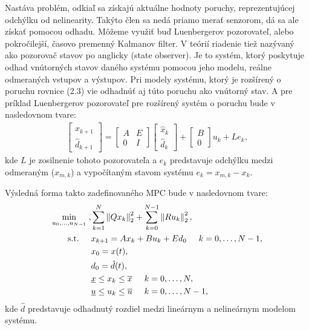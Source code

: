 Nastáva problém, odkiaľ sa získajú aktuálne hodnoty poruchy, reprezentujúcej odchýlku od nelinearity. Takýto člen sa nedá priamo merať senzorom, dá sa ale získať pomocou odhadu. Môžeme využiť buď Luenbergerov pozorovateľ, alebo pokročilejší, časovo premenný Kalmanov filter. V teórií riadenie tiež nazývaný ako pozorovač stavov po anglicky (state observer). Je to systém, ktorý poskytuje odhad vnútorných stavov daného systému pomocou jeho modelu, reálne odmeraných vstupov a výstupov. Pri modely systému, ktorý je rozšírený o poruchu rovnice (2.3) vie odhadnúť aj túto poruchu ako vnútorný stav. A pre príklad Luenbergerov pozorovateľ pre rozšírený systém o poruchu bude v nasledovnom tvare:
\begin{align}
	\begin{bmatrix}
		\hat{x}_{k+1}\\
		\hat{d}_{k+1}
	\end{bmatrix} = 
	\begin{bmatrix}
		A&E\\
		0&I
	\end{bmatrix}
	\begin{bmatrix}
		\hat{x}_{k}\\
		\hat{d}_{k}
	\end{bmatrix}+
	\begin{bmatrix}
		B\\
		0
	\end{bmatrix}u_{k} + Le_{k},
\end{align}
kde $L$ je zosilnenie tohoto pozorovateľa a $e_{k}$ predstavuje odchýlku medzi odmeraným ($x_{m,k}$) a vypočítaným stavom systému $e_{k}= x_{m,k}-x_{k}$.

Výsledná forma takto zadefinovaného MPC bude v nasledovnom tvare:
\begin{subequations}
	\begin{align}
	\displaystyle \min_{u_0,...,u_{N-1}} \hspace{0.1cm}, & 
	\sum_{k=1}^{N}\left\lVert Qx_k\right\rVert^{2}_{2}+\sum_{k=0}^{N-1}\left\lVert Ru_k\right\rVert^{2}_{2},\\
	\textrm{s.t.} \hspace{0.5cm} & x_{k+1} = Ax_{k} + Bu_{k} + Ed_{0}\hspace{0.5cm} k=0,\dots,N-1,\\
	& x_{0} = x(t),\\
	& d_{0} = \hat{d}(t),\\
	& \underline{x} \leq x_{k} \leq \overline{x}\hspace{0.5cm} k=0,\dots,N,\\
	& \underline{u} \leq u_{k} \leq \overline{u}\hspace{0.5cm} k=0,\dots,N-1,
	\end{align}
\end{subequations}
kde $\hat{d}$ predstavuje odhadnutý rozdiel medzi lineárnym a nelineárnym modelom systému.

